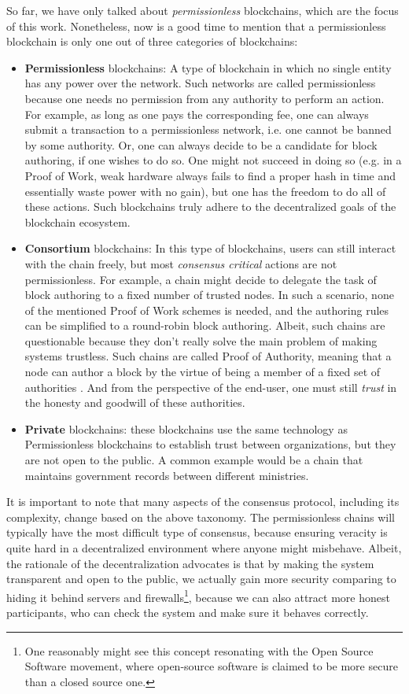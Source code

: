 So far, we have only talked about \textit{permissionless} blockchains, which are the focus of this
work. Nonetheless, now is a good time to mention that a permissionless blockchain is only one out of
three categories of blockchains:

\begin{itemize}
	\item \textbf{Permissionless} blockchains: A type of blockchain in which no single entity has
	any power over the network. Such networks are called permissionless because one needs no
	permission from any authority to perform an action. For example, as long as one pays the
	corresponding fee, one can always submit a transaction to a permissionless network, i.e. one
	cannot be banned by some authority. Or, one can always decide to be a candidate for block
	authoring, if one wishes to do so. One might not succeed in doing so (e.g. in a Proof of Work,
	weak hardware always fails to find a proper hash in time and essentially waste power with no
	gain), but one has the freedom to do all of these actions. Such blockchains truly adhere to the
	decentralized goals of the blockchain ecosystem.
	\item \textbf{Consortium} blockchains: In this type of blockchains, users can still interact
	with the chain freely, but most \textit{consensus critical} actions are not permissionless. For
	example, a chain might decide to delegate the task of block authoring to a fixed number of
	trusted nodes. In such a scenario, none of the mentioned Proof of Work schemes is needed, and
	the authoring rules can be simplified to a round-robin block authoring. Albeit, such chains are
	questionable because they don't really solve the main problem of making systems trustless. Such
	chains are called Proof of Authority, meaning that a node can author a block by the virtue of
	being a member of a fixed set of authorities \cite{deangelisPBFTVsProofofauthority2018}. And
	from the perspective of the end-user, one must still \textit{trust} in the honesty and goodwill
	of these authorities.
	\item \textbf{Private} blockchains: these blockchains use the same technology as Permissionless
	blockchains to establish trust between organizations, but they are not open to the public. A
	common example would be a chain that maintains government records between different ministries.
\end{itemize}

It is important to note that many aspects of the consensus protocol, including its complexity,
change based on the above taxonomy. The permissionless chains will typically have the most difficult
type of consensus, because ensuring veracity is quite hard in a decentralized environment where
anyone might misbehave. Albeit, the rationale of the decentralization advocates is that by making
the system transparent and open to the public, we actually gain more security comparing to hiding it
behind servers and firewalls\footnote{One reasonably might see this concept resonating with the Open
Source Software movement, where open-source software is claimed to be more secure than a closed
source one.}, because we can also attract more honest participants, who can check the system and
make sure it behaves correctly.

